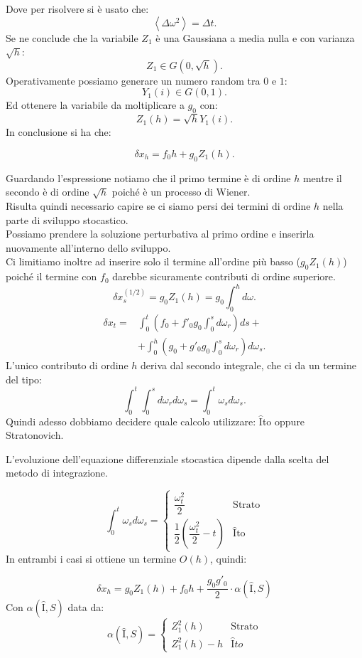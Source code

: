 Dove per risolvere si è usato che:
\[
    \left<\Delta\omega^2\right> = \Delta t
.\] 
Se ne conclude che la variabile $Z_1$ è una Gaussiana a media nulla e con varianza $\sqrt{h}$:
\[
    Z_1 \in G(0,\sqrt{h}) 
.\] 
Operativamente possiamo generare un numero random tra $0$ e $1$:
\[
    Y_1(i) \in G(0,1) 
.\] 
Ed ottenere la variabile da moltiplicare a $g_0$ con:
\[
    Z_1(h) = \sqrt{h} Y_1(i) 
.\] 
In conclusione si ha che:
\begin{redbox}{}
\[
    \delta x_h = f_0 h + g_0Z_1(h) 
.\]     
\end{redbox}
\noindent
Guardando l'espressione notiamo che il primo termine è di ordine $h$ mentre il secondo è di ordine $\sqrt{h}$  poiché è un processo di Wiener. \\
Risulta quindi necessario capire se ci siamo persi dei termini di ordine $h$  nella parte di sviluppo stocastico.\\
Possiamo prendere la soluzione perturbativa al primo ordine e inserirla nuovamente all'interno dello sviluppo.\\
Ci limitiamo inoltre ad inserire solo il termine all'ordine più basso ($g_0Z_1(h)$) poiché il termine con $f_0$  darebbe sicuramente contributi di ordine superiore.
\[
    \delta x_s^{(1 /2)} = g_0Z_1(h) = g_0  \int_{0}^{h} d\omega 
.\] 
\[\begin{aligned}
    \delta x_t = &\int_{0}^{t} \left(f_0 + f'_0 g_0\int_{0}^{s}d\omega_r  \right) ds + \\
		 & + \int_{0}^{h} \left(g_0+ g'_0 g_0 \int_{0}^{s} d\omega_r\right)d\omega_s  
.\end{aligned}\]
L'unico contributo di ordine $h$  deriva dal secondo integrale, che ci da un termine del tipo:
\[
    \int_{0}^{t} \int_{0}^{s} d\omega_r d\omega_s = \int_{0}^{t} \omega_sd\omega_s 
.\] 
Quindi adesso dobbiamo decidere quale calcolo utilizzare: $\hat{\text{I}}$to oppure Stratonovich. 
\begin{bluebox}{}
    L'evoluzione dell'equazione differenziale stocastica dipende dalla scelta del metodo di integrazione.
\end{bluebox}
\[
  \int_{0}^{t} \omega_sd\omega_s =
  \begin{cases}
      \dfrac{\omega_t^2}{2} & \text{Strato}\\
      \dfrac{1}{2}\left(\dfrac{\omega_t^2}{2} - t\right) & \hat{\text{I}}\text{to}
  \end{cases}
\] 
In entrambi i casi si ottiene un termine $O(h)$, quindi:
\begin{redbox}{}
 \[
    \delta x_h = 
    g_0Z_1(h) +
    f_0h + 
    \frac{g_0g'_0}{2}\cdot \alpha (\hat{\text{I}}, S) 
\] 
Con $\alpha (\hat{\text{I}}, S)$ data da:
\[
    \alpha (\hat{\text{I}}, S) = 
    \begin{cases}
	Z_1^2(h) & \text{Strato}\\
	Z_1^2(h) - h & \hat{\text{I}}to
    \end{cases}
\]    
\end{redbox}
\noindent
